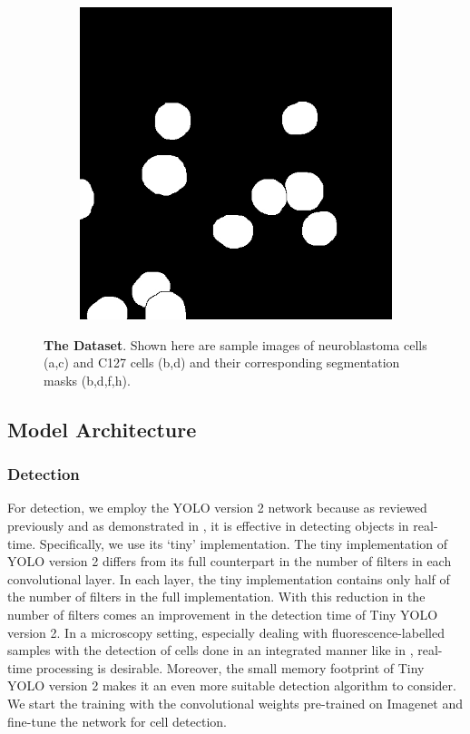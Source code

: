 \documentclass[10pt, journal, compsoc]{IEEEtran}
\begin{document}
\begin{figure}
\begin{subfigure}[b]{0.24\linewidth}
\caption{}
\end{subfigure}
\begin{subfigure}[b]{0.24\linewidth}
\includegraphics[width=\linewidth]{c127/108641-label.jpg}
\caption{}
\end{subfigure}
\caption{\textbf{The Dataset}. Shown here are sample images of neuroblastoma cells (a,c) and C127 cells (b,d) and their corresponding segmentation masks (b,d,f,h). }
\end{figure}
\subsection{Model Architecture}
\subsubsection{Detection}
For detection, we employ the YOLO version 2 network because as reviewed previously and as demonstrated in \cite{Waithe544833}, it is effective in detecting objects in real-time. Specifically, we use its `tiny' implementation. The tiny implementation of YOLO version 2 differs from its full counterpart in the number of filters in each convolutional layer. In each layer, the tiny implementation contains only half of the number of filters in the full implementation. With this reduction in the number of filters comes an improvement in the detection time of Tiny YOLO version 2. In a microscopy setting, especially dealing with fluorescence-labelled samples with the detection of cells done in an integrated manner like in \cite{Waithe544833}, real-time processing is desirable. Moreover, the small memory footprint of Tiny YOLO version 2 makes it an even more suitable detection algorithm to consider. We start the training with the convolutional weights pre-trained on Imagenet and fine-tune the network for cell detection.
\end{document}
